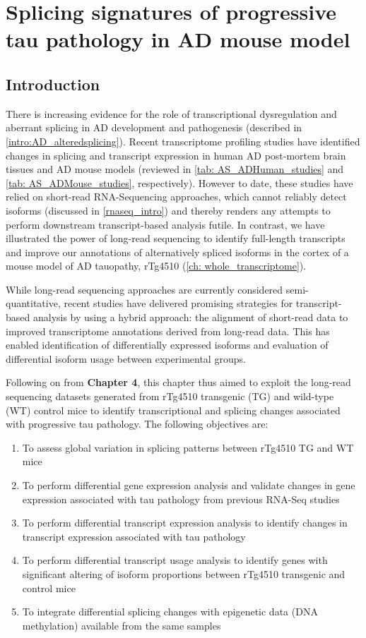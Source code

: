\chapter{Splicing signatures of progressive tau pathology in AD mouse model}\label{ch: transcriptional_global_differences}

\section{Introduction}
There is increasing evidence for the role of transcriptional dysregulation and aberrant splicing in AD development and pathogenesis (described in \cref{intro:AD_alteredsplicing}). Recent transcriptome profiling studies have identified changes in splicing and transcript expression in human AD post-mortem brain tissues and AD mouse models (reviewed in \cref{tab: AS_ADHuman_studies} and \cref{tab: AS_ADMouse_studies}, respectively). However to date, these studies have relied on short-read RNA-Sequencing approaches, which cannot reliably detect isoforms (discussed in \cref{rnaseq_intro}) and thereby renders any attempts to perform downstream transcript-based analysis futile. In contrast, we have illustrated the power of long-read sequencing to identify full-length transcripts and improve our annotations of alternatively spliced isoforms in the cortex of a mouse model of AD tauopathy, rTg4510 (\cref{ch: whole_transcriptome}). 

While long-read sequencing approaches are currently considered semi-quantitative, recent studies have delivered promising strategies for transcript-based analysis by using a hybrid approach\cite{Tseng2021}: the alignment of short-read data to improved transcriptome annotations derived from long-read data. This has enabled identification of differentially expressed isoforms and evaluation of differential isoform usage between experimental groups\cite{Tseng2021}. 

Following on from \textbf{Chapter 4}, this chapter thus aimed to exploit the long-read sequencing datasets generated from rTg4510 transgenic (TG) and wild-type (WT) control mice to identify transcriptional and splicing changes associated with progressive tau pathology. The following objectives are: 
\begin{enumerate}
	\item To assess global variation in splicing patterns between rTg4510 TG and WT mice
	\item To perform differential gene expression analysis and validate changes in gene expression associated with tau pathology from previous RNA-Seq studies 
	\item To perform differential transcript expression analysis to identify changes in transcript expression associated with tau pathology   
	\item To perform differential transcript usage analysis to identify genes with significant altering of isoform proportions between rTg4510 transgenic and control mice 
	\item To integrate differential splicing changes with epigenetic data (DNA methylation) available from the same samples
\end{enumerate} 

